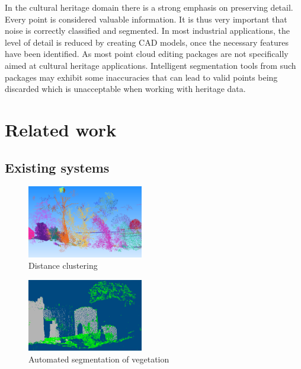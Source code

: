 \documentclass[10pt,twocolumn]{article}
\begin{document}
In the cultural heritage domain there is a strong emphasis on preserving detail. Every point is considered valuable information. It is thus very important that noise is correctly classified and segmented. In most industrial applications, the level of detail is reduced by creating CAD models, once the necessary features have been identified. As most point cloud editing packages are not specifically aimed at cultural heritage applications. Intelligent segmentation tools from such packages may exhibit some inaccuracies that can lead to valid points being discarded which is unacceptable when working with heritage data.

\section{Related work}

\subsection{Existing systems}

\begin{figure}[htb]
\centering
\includegraphics[width=0.45\textwidth]{3dreshaper.png}
\caption{Distance clustering \cite{Technodigit2012}}
\label{fig:dist}
\end{figure}

\begin{figure}[htb]
\centering
\includegraphics[width=0.45\textwidth]{vrmesh.png}
\caption{Automated segmentation of vegetation \cite{VirtualGrid2012}}
\label{fig:trees}
\end{figure}
\end{document}
